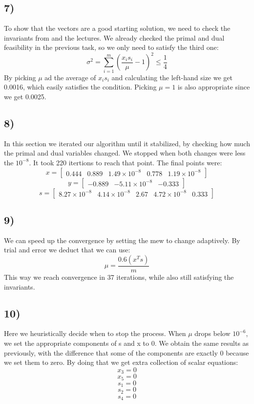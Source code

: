\documentclass[9pt]{IEEEtran}
\begin{document}
\subsection*{7)}
To show that the vectors are a good starting solution, we need to check 
the invariants from \cite{mehlhorn2016still} and the lectures. We already 
checked the primal and dual feasibility in the previous task, so we only need 
to satisfy the third one:
\[
\sigma^2 =\sum_{i=1}^{m} \left( \frac{x_i s_i}{\mu} - 1 \right)^2 \le \frac{1}{4}
\]
By picking $\mu$ ad the average of $x_i s_i$ and calculating the left-hand size we 
get 0.0016, which easily satisfies the condition. Picking $\mu = 1$ is also 
appropriate since we get 0.0025.
\subsection*{8)}
In this section we iterated our algorithm until it stabilized, by checking how
much the primal and dual variables changed. We stopped when both changes 
were less the $10^{-8}$. It took 220 itertions to reach that point. The final 
points were: 
\[
x = \begin{bmatrix}
0.444 & 0.889 & 1.49 \times 10^{-8} & 0.778 & 1.19 \times 10^{-8}
\end{bmatrix}
\]
\[
y = \begin{bmatrix}
-0.889 & -5.11 \times 10^{-8} & -0.333
\end{bmatrix}
\]
\[
s =  \begin{bmatrix}
    8.27\times10^{-8} & 4.14\times10^{-8} & 2.67 & 4.72\times10^{-8} & 0.333
\end{bmatrix}
\]

\subsection*{9)}
We can speed up the convergence by setting the mew to change adaptively. 
By trial and error we deduct that we can use: 
\[
\mu = \frac{0.6  (x^T s) }{m}
\]
This way we reach convergence in 37 iterations, while also still satisfying the 
invariants. 

\subsection*{10)}
Here we heuristically decide when to stop the process. When $\mu$ drops 
below $10^{-6}$, we set the appropriate components of s and x to 0. 
We obtain the same results as previously, with the difference that some of 
the components are exactly 0 because we set them to zero. By doing that we 
get extra collection of scalar equations:
\[
x_3 = 0 \]
\[
x_5 = 0 \]
\[
s_1 = 0 \]
\[
s_2 = 0 \]
\[
s_4 = 0
\]
\end{document}
